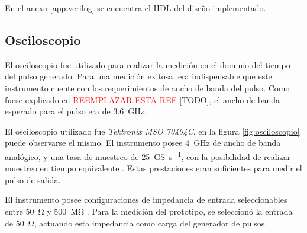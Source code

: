 En el anexo \ref{app:verilog} se encuentra el HDL del diseño implementado.

\subsection{Osciloscopio}

El osciloscopio fue utilizado para realizar la medición en el dominio del tiempo
del pulso generado. Para una medición exitosa, era indispensable que este
instrumento cuente con los requerimientos de ancho de banda del pulso. Como fuese
explicado en \textcolor{red}{REEMPLAZAR ESTA REF \ref{TODO}}, el ancho de banda
esperado para el pulso era de \qty{3.6}{\giga\hertz}.

El osciloscopio utilizado fue \textit{Tektronix MSO 70404C}, en la figura 
\ref{fig:osciloscopio} puede observarse el mismo. El instrumento posee 
\qty{4}{\giga\hertz} de ancho de banda analógico, y una tasa de muestreo
de \qty[per-mode=symbol]{25}{\giga\siemens\per\second}, con la posibilidad de
realizar muestreo en tiempo equivalente \cite{oscilloscope_datasheet}. Estas
prestaciones eran suficientes para medir el pulso de salida.

El instrumento posee configuraciones de impedancia de entrada seleccionables entre
\qty{50}{\ohm} y \qty{500}{\mega\ohm} \cite{oscilloscope_datasheet}. Para la
medición del prototipo, se seleccionó la entrada de \qty{50}{\ohm}, actuando
esta impedancia como carga del generador de pulsos.

